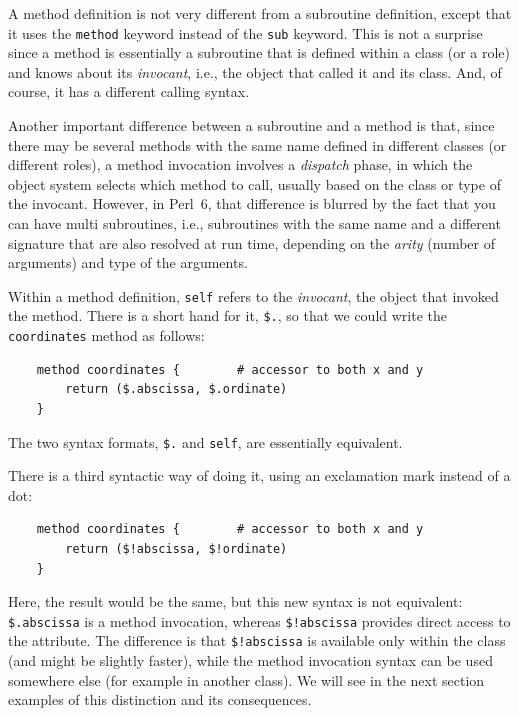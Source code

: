 A method definition is not very different from a subroutine 
definition, except that it uses the {\tt method} keyword 
instead of the {\tt sub} keyword. This is not a surprise 
since a method is essentially a subroutine that is defined 
within a class (or a role) and knows about its 
\emph{invocant}, i.e., the object that called it and its class. 
And, of course, it has a different calling syntax.

Another important difference between a subroutine and a method 
is that, since there may be several methods with the same name 
defined in different classes (or different roles), a method 
invocation involves a \emph{dispatch} phase, in 
which the object system selects which method to call, usually 
based on the class or type of the invocant. However, in 
Perl~6, that difference is blurred by the fact that you can 
have multi subroutines, i.e., subroutines with the same name 
and a different signature that are also resolved at run time, 
depending on the \emph{arity} (number of arguments) and type of 
the arguments. 

Within a method definition, {\tt self} refers to the 
\emph{invocant}, the object that invoked the method. 
There is a short hand for it, \verb'$.', so that we could 
write the {\tt coordinates} method as follows:

\begin{verbatim}
    method coordinates {        # accessor to both x and y
        return ($.abscissa, $.ordinate)
    }
\end{verbatim}

The two  syntax formats, \verb'$.' and {\tt self}, are 
essentially equivalent.

There is a third syntactic way of doing it, using an 
exclamation mark instead of a dot:

\begin{verbatim}
    method coordinates {        # accessor to both x and y
        return ($!abscissa, $!ordinate)
    }
\end{verbatim}

Here, the result would be the same, but this new syntax is 
not equivalent: \verb'$.abscissa' is a method invocation, 
whereas \verb'$!abscissa' provides direct access to the attribute.
The difference is that \verb'$!abscissa' is available only 
within the class (and might be slightly faster), while 
the method invocation syntax can be used somewhere else 
(for example in another class). We will see in the next section 
examples of this distinction and its consequences.

